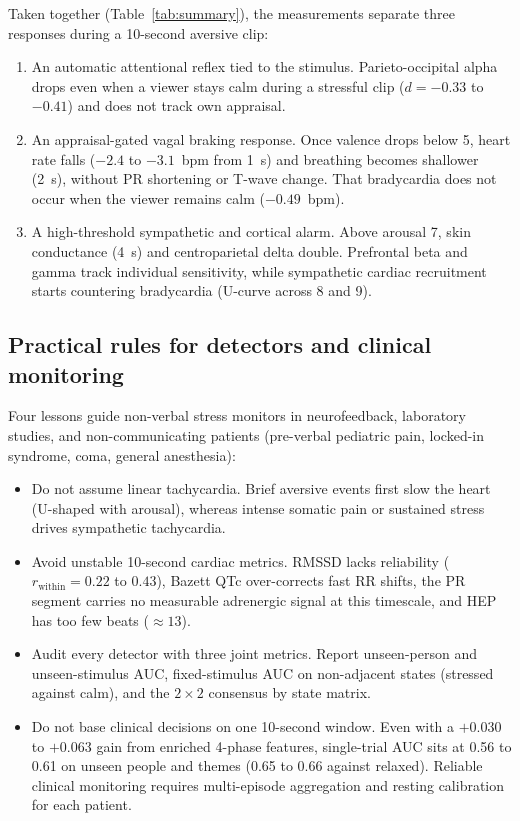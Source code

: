 \documentclass[10pt]{article}
\begin{document}
Taken together (Table~\ref{tab:summary}), the measurements separate three responses during a 10-second aversive clip:
\begin{enumerate}
\item An automatic attentional reflex tied to the stimulus. Parieto-occipital alpha drops even when a viewer stays calm during a stressful clip ($d = -0.33$ to $-0.41$) and does not track own appraisal.
\item An appraisal-gated vagal braking response. Once valence drops below 5, heart rate falls ($-2.4$ to $-3.1$~bpm from 1~s) and breathing becomes shallower (2~s), without PR shortening or T-wave change. That bradycardia does not occur when the viewer remains calm ($-0.49$~bpm).
\item A high-threshold sympathetic and cortical alarm. Above arousal 7, skin conductance (4~s) and centroparietal delta double. Prefrontal beta and gamma track individual sensitivity, while sympathetic cardiac recruitment starts countering bradycardia (U-curve across 8 and 9).
\end{enumerate}

\subsection{Practical rules for detectors and clinical monitoring}

Four lessons guide non-verbal stress monitors in neurofeedback, laboratory studies, and non-communicating patients (pre-verbal pediatric pain, locked-in syndrome, coma, general anesthesia):
\begin{itemize}
\item Do not assume linear tachycardia. Brief aversive events first slow the heart (U-shaped with arousal), whereas intense somatic pain or sustained stress drives sympathetic tachycardia.
\item Avoid unstable 10-second cardiac metrics. RMSSD lacks reliability ($r_{\text{within}} = 0.22$ to $0.43$), Bazett QTc over-corrects fast RR shifts, the PR segment carries no measurable adrenergic signal at this timescale, and HEP has too few beats ($\approx 13$).
\item Audit every detector with three joint metrics. Report unseen-person and unseen-stimulus AUC, fixed-stimulus AUC on non-adjacent states (stressed against calm), and the $2 \times 2$ consensus by state matrix.
\item Do not base clinical decisions on one 10-second window. Even with a $+0.030$ to $+0.063$ gain from enriched 4-phase features, single-trial AUC sits at 0.56 to 0.61 on unseen people and themes (0.65 to 0.66 against relaxed). Reliable clinical monitoring requires multi-episode aggregation and resting calibration for each patient.
\end{itemize}
\end{document}

